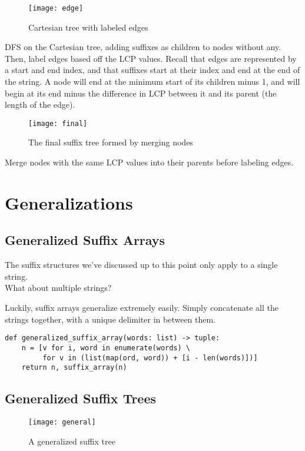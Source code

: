 \documentclass[11pt, oneside]{article}
\begin{document}
\begin{figure}[h!]
\centering
\texttt{[image: edge]}
\caption{Cartesian tree with labeled edges}
\end{figure}

DFS on the Cartesian tree, adding suffixes as children to nodes without any.
Then, label edges based off the LCP values.
Recall that edges are represented by a start and end index, and that
suffixes start at their index and end at the end of the string.
A node will end at the minimum start of its children minus 1,
and will begin at its end minus the difference in LCP between it and its parent
(the length of the edge).
\newpage
\begin{figure}[h!]
\centering
\texttt{[image: final]}
\caption{The final suffix tree formed by merging nodes}
\end{figure}

Merge nodes with the same LCP values into their parents before labeling edges.

\section{Generalizations}
\subsection{Generalized Suffix Arrays}

The suffix structures we've discussed up to this point only apply to a single string. \\
What about multiple strings?

Luckily, suffix arrays generalize extremely easily.
Simply concatenate all the strings together, with a unique delimiter in between them.

\begin{verbatim}
def generalized_suffix_array(words: list) -> tuple:
    n = [v for i, word in enumerate(words) \
         for v in (list(map(ord, word)) + [i - len(words)])]
    return n, suffix_array(n)
\end{verbatim}

\subsection{Generalized Suffix Trees}

\begin{figure}[h!]
\centering
\texttt{[image: general]}
\caption{A generalized suffix tree}
\end{figure}
\end{document}
